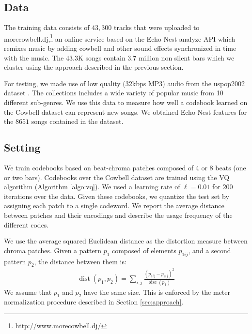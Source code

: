 \documentclass{article}
\DeclareMathOperator*{\dist}{dist}
\DeclareMathOperator*{\size}{size}
\newcommand{\ie}{i.e.~}
\begin{document}
\subsection{Data}
\label{sec:traindata}
\label{sec:testdata}
The training data consists of $43,300$ tracks that were uploaded to
morecowbell.dj,\footnote{http://www.morecowbell.dj/} an online service
based on the Echo Nest analyze API which remixes music by
adding cowbell and other sound effects synchronized in time with the
music.  The $43.3$K songs contain $\mathbf{3.7}$ million non silent
bars which we cluster using the approach described in the previous
section.

For testing, we made use of low quality (32kbps MP3) audio 
from the uspop2002 dataset \cite{uspop2002}.  The collections
includes a wide variety of popular music from 10 different sub-genres.
We use this data to measure how well a codebook learned on
the Cowbell dataset can represent new songs.  
We obtained Echo Nest features for the $8651$ songs contained in the dataset.

\subsection{Setting}\label{ssec:setting}
We train codebooks based on beat-chroma patches composed of 4 or 8
beats (one or two bars).
Codebooks over the Cowbell
dataset are trained using the VQ algorithm (Algorithm \ref{algo:vq}). We used a
learning rate of $\ell=0.01$ for $200$ iterations over the data.
%
Given these codebooks, we quantize the test set by assigning each
patch to a single codeword.  We report the average
distance between patches and their encodings and describe the usage
frequency of the different codes. %

We use the average squared Euclidean distance as the distortion
measure between chroma patches.  Given a pattern $p_1$
composed of elements $p_{1ij}$, and a second pattern $p_2$, the
distance between them is:
\begin{eqnarray}
  \dist(p_1,p_2) = \sum_{i,j} \frac{(p_{1ij} - p_{2ij})^2}{\size(p_1)}
  \label{eq:dist}
\end{eqnarray}
We assume that $p_1$ and $p_2$ have the same size.  This is enforced by the
meter normalization procedure described in Section \ref{sec:approach}.
\end{document}
